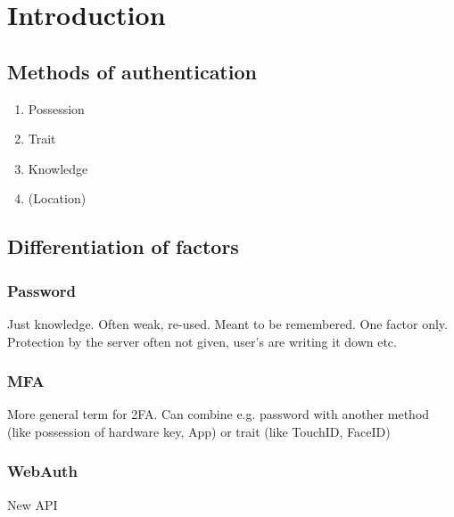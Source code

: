 \chapter{Introduction}

\blindtext

\section{Methods of authentication}

\begin{enumerate}
	\item Possession
	\item Trait
	\item Knowledge
	\item (Location)
\end{enumerate}

\section{Differentiation of factors}

\subsection{Password}

Just knowledge. Often weak, re-used. Meant to be remembered. One factor only.\\
Protection by the server often not given, user's are writing it down etc.

\subsection{MFA}

More general term for 2FA. Can combine e.g. password with another method (like possession of hardware key, App) or trait (like TouchID, FaceID)

\subsection{WebAuth}

New API